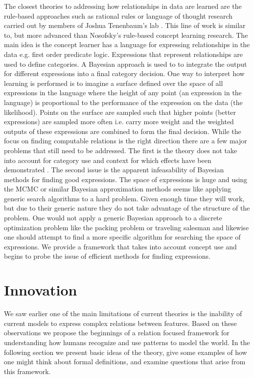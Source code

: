 \documentclass[doc]{apa}%
\begin{document}
The closest theories to addressing how relationships in data are learned
are the rule-based approaches such as rational rules or language of
thought research carried out by members of Joshua Tenenbaum's lab \cite{rrndg}\cite{KempGT07}.  This
line of work is similar to, but more advanced than Nosofsky's
rule-based concept learning research.  The main idea is the concept
learner has a language for expressing relationships in the data
e.g. first order predicate logic.  Expressions that represent
relationships are used to define categories.  A Bayesian approach is used to to integrate
the output for different expressions into a final category decision.
One way to interpret how learning is performed is to imagine a surface defined over the
space of all expressions in the language where the height of any point
(an expression in the language) is proportional to the performance of
the expression on the data (the likelihood).  Points on the surface are sampled such
that higher points (better expressions) are sampled more often i.e. carry more weight and the
weighted outputs of these expressions are
combined to form the final decision.  While the focus on finding
computable relations is the right direction there are a few major
problems that still need to be addressed.  The first is the theory
does not take into account for category use and context for which effects
have been demonstrated \cite{RossBFest}.  The second issue is the apparent
infeasability of Bayesian methods for finding good expressions.  The
space of expressions is huge and using the MCMC or similar Bayesian
approximation methods seems like applying generic search algorithms to
a hard problem.  Given enough time they will work, but due to their
generic nature they do not take advantage of the structure of the
problem.  One would not apply a generic Bayesian approach to a
discrete optimization problem like the packing problem or traveling
salesman and likewise one should attempt to find a more specific
algorithm for searching the space of expressions.  We provide a
framework that takes into account concept use and begins to probe the
issue of efficient methods for finding expressions.         

\section{Innovation}
We saw earlier one of the main limitations of current theories is the
inability of current models to express complex relations between
features.  Based on these observations we propose the beginnings of a
relation focused framework for understanding how humans recognize and use patterns
to model the world.  In the following section we present basic ideas
of the theory, give some examples of how one might think about formal
definitions, and examine questions that arise from this framework.
\end{document}
